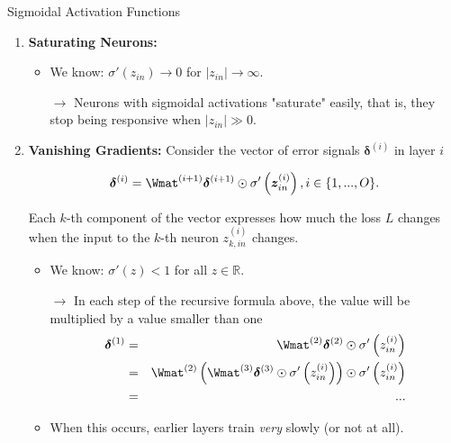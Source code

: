 \begin{vbframe}{Sigmoidal Activation Functions}

\begin{enumerate}
  \item \textbf{Saturating Neurons:}
  \begin{itemize}
    \item We know: $\sigma'\left(z_{in}\right) \to 0$ for $|z_{in}| \to \infty$. 
    \item[$\to$] Neurons with sigmoidal activations "saturate" easily, that is, they stop being responsive when $|z_{in}| \gg 0$. 
  \end{itemize}

  \framebreak 

  \item \textbf{Vanishing Gradients: } Consider the vector of error signals $\bm{\delta}^{(i)}$ in layer $i$ 

    $$
      \bm{\delta}^{(i)} = \Wmat^{(i + 1)} \bm{\delta}^{(i + 1)} \odot \sigma'\left(\bm{z}_{in}^{(i)}\right), i \in\{ 1, ..., O\}. 
    $$

    Each $k$-th component of the vector expresses how much the loss $L$ changes when the input to the $k$-th neuron $z_{k, in}^{(i)}$ changes. 
    \begin{itemize}
      \item We know: $\sigma'(z)< 1$ for all $z \in \mathbb{R}$. 
      \item[$\to$] In each step of the recursive formula above, the value will be multiplied by a value smaller than one
      \begin{eqnarray*}
        \bm{\delta}^{(1)} &=& \Wmat^{(2)} \bm{\delta}^{(2)} \odot \sigma'\left(z_{in}^{(i)}\right) \\
        &=& \Wmat^{(2)} \left(\Wmat^{(3)} \bm{\delta}^{(3)} \odot \sigma'\left(z_{in}^{(i)}\right)\right) \odot \sigma'\left(z_{in}^{(i)}\right) \\
        &=& ...
      \end{eqnarray*}
      \item When this occurs, earlier layers train \emph{very} slowly (or not at all).
    \end{itemize}
\end{enumerate}

\end{vbframe}


